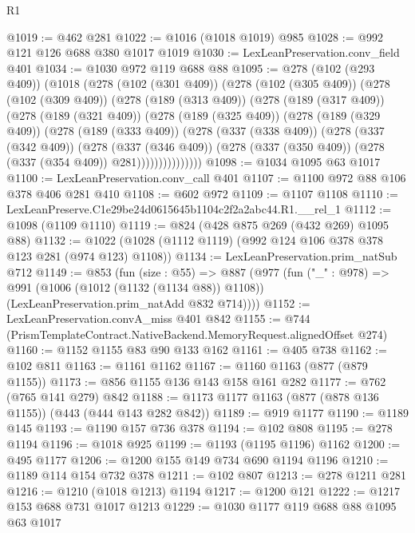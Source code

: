 \begin{lexlean}{R1}
\begin{coremodule}
@1019 := @462 @281
@1022 := @1016 (@1018 @1019) @985
@1028 := @992 @121 @126 @688 @380 @1017 @1019
@1030 := LexLeanPreservation.conv_field @401
@1034 := @1030 @972 @119 @688 @88
@1095 := @278
    (@102 (@293 @409))
    (@1018
      (@278
        (@102 (@301 @409))
        (@278
          (@102 (@305 @409))
          (@278
            (@102 (@309 @409))
            (@278
              (@189 (@313 @409))
              (@278
                (@189 (@317 @409))
                (@278
                  (@189 (@321 @409))
                  (@278
                    (@189 (@325 @409))
                    (@278
                      (@189 (@329 @409))
                      (@278
                        (@189 (@333 @409))
                        (@278
                          (@337 (@338 @409))
                          (@278
                            (@337 (@342 @409))
                            (@278
                              (@337 (@346 @409))
                              (@278 (@337 (@350 @409)) (@278 (@337 (@354 @409)) @281)))))))))))))))
@1098 := @1034 @1095 @63 @1017
@1100 := LexLeanPreservation.conv_call @401
@1107 := @1100 @972 @88 @106 @378 @406 @281 @410
@1108 := @602 @972
@1109 := @1107 @1108
@1110 := LexLeanPreserve.C1e29be24d0615645b1104c2f2a2abc44.R1.__rel_1
@1112 := @1098 (@1109 @1110)
@1119 := @824 (@428 @875 @269 (@432 @269) @1095 @88)
@1132 := @1022 (@1028 (@1112 @1119) (@992 @124 @106 @378 @378 @123 @281 (@974 @123) @1108))
@1134 := LexLeanPreservation.prim_natSub @712
@1149 := @853
    (fun (size : @55) =>
    @887
      (@977
        (fun ("_" : @978) =>
        @991
          (@1006 (@1012 (@1132 (@1134 @88)) @1108))
          (LexLeanPreservation.prim_natAdd @832 @714))))
@1152 := LexLeanPreservation.convA_miss @401 @842
@1155 := @744 (PrismTemplateContract.NativeBackend.MemoryRequest.alignedOffset @274)
@1160 := @1152 @1155 @83 @90 @133 @162
@1161 := @405 @738
@1162 := @102 @811
@1163 := @1161 @1162
@1167 := @1160 @1163 (@877 (@879 @1155))
@1173 := @856 @1155 @136 @143 @158 @161 @282
@1177 := @762 (@765 @141 @279) @842
@1188 := @1173 @1177 @1163 (@877 (@878 @136 @1155)) (@443 (@444 @143 @282 @842))
@1189 := @919 @1177
@1190 := @1189 @145
@1193 := @1190 @157 @736 @378
@1194 := @102 @808
@1195 := @278 @1194
@1196 := @1018 @925
@1199 := @1193 (@1195 @1196) @1162
@1200 := @495 @1177
@1206 := @1200 @155 @149 @734 @690 @1194 @1196
@1210 := @1189 @114 @154 @732 @378
@1211 := @102 @807
@1213 := @278 @1211 @281
@1216 := @1210 (@1018 @1213) @1194
@1217 := @1200 @121
@1222 := @1217 @153 @688 @731 @1017 @1213
@1229 := @1030 @1177 @119 @688 @88 @1095 @63 @1017

\end{coremodule}
\end{lexlean}
